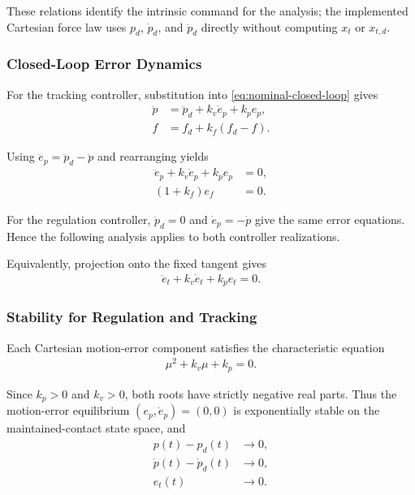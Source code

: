 \documentclass[10pt,journal,letterpaper]{IEEEtran}
\begin{document}
These relations identify the intrinsic command for the analysis; the implemented Cartesian force law uses $p_d$, $\dot p_d$, and $\ddot p_d$ directly without computing $x_t$ or $x_{t,d}$.

\subsubsection{Closed-Loop Error Dynamics}

For the tracking controller, substitution into \eqref{eq:nominal-closed-loop} gives
\begin{align*}
\ddot p&=\ddot p_d+k_v\dot e_p+k_pe_p,\\
f&=f_d+k_f(f_d-f).
\end{align*}

Using $\ddot e_p=\ddot p_d-\ddot p$ and rearranging yields
\begin{equation}\label{eq:fic-error-dynamics}
\begin{aligned}
\ddot e_p+k_v\dot e_p+k_pe_p&=0,\\
(1+k_f)e_f&=0.
\end{aligned}
\end{equation}

For the regulation controller, $\ddot p_d=0$ and $\dot e_p=-\dot p$ give the same error equations. Hence the following analysis applies to both controller realizations.

Equivalently, projection onto the fixed tangent gives
\begin{equation}\label{eq:fic-tangential-error}
\begin{aligned}
\ddot e_t+k_v\dot e_t+k_pe_t=0.
\end{aligned}
\end{equation}

\subsubsection{Stability for Regulation and Tracking}

Each Cartesian motion-error component satisfies the characteristic equation
\begin{align*}
\mu^2+k_v\mu+k_p=0.
\end{align*}

Since $k_p>0$ and $k_v>0$, both roots have strictly negative real parts. Thus the motion-error equilibrium $(e_p,\dot e_p)=(0,0)$ is exponentially stable on the maintained-contact state space, and
\begin{align*}
p(t)-p_d(t)&\to0,\\
\dot p(t)-\dot p_d(t)&\to0,\\
e_t(t)&\to0.
\end{align*}
\end{document}
